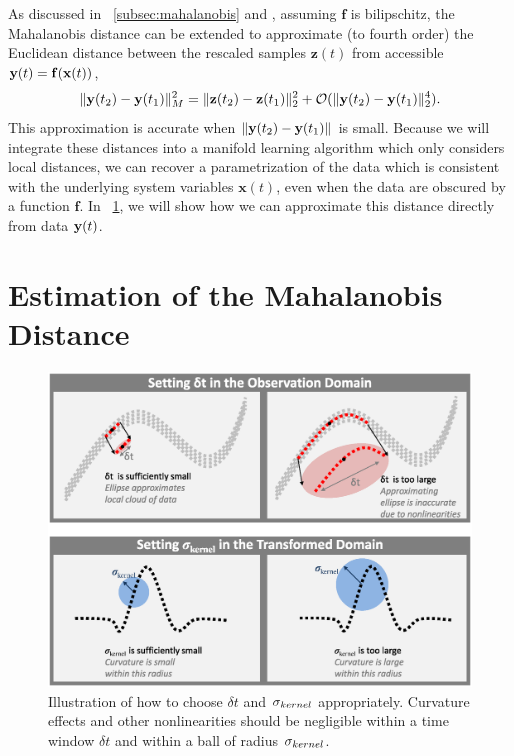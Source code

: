 %
As discussed in \sec~\ref{subsec:mahalanobis} and \cite{singer2008non}, assuming $\mathbf{f}$ is bilipschitz, the Mahalanobis distance can be extended to approximate (to fourth order) the Euclidean distance between the rescaled samples $\mathbf{z}(t)$ from accessible $\mathbf{y}(t) = \mathbf{f} (\mathbf{x}(t))$,
%
\begin{equation} \label{eq:mahalanobis2}
\| \mathbf{y}(t_2) - \mathbf{y}(t_1) \|^2_M = \| \mathbf{z}(t_2) - \mathbf{z}(t_1) \|^2_2 + \mathcal{O}(\| \mathbf{y}(t_2) - \mathbf{y}(t_1) \|^4_2).
\end{equation}
%
This approximation is accurate when $\| \mathbf{y}(t_2) - \mathbf{y}(t_1) \|$ is small.
%
Because we will integrate these distances into a manifold learning algorithm which only considers local distances, we can recover a parametrization of the data which is consistent with the underlying system variables $\mathbf{x}(t)$, even when the data are obscured by a function $\mathbf{f}$.
%
In \sec~\ref{sec:analysis}, we will show how we can approximate this distance directly from data $\mathbf{y}(t)$.

\section{Estimation of the Mahalanobis Distance} \label{sec:analysis}

\begin{figure}[t]
\centering
\includegraphics[width=\textwidth]{schematic}
\caption[Schematic of relevant parameters for analysis of multiscale data]{Illustration of how to choose $\delta t$ and $\sigma_{kernel}$ appropriately. 	Curvature effects and other nonlinearities should be negligible within a time window $\delta t$ and within a ball of radius $\sigma_{kernel}$.}
\label{fig:schematic}
\end{figure}


